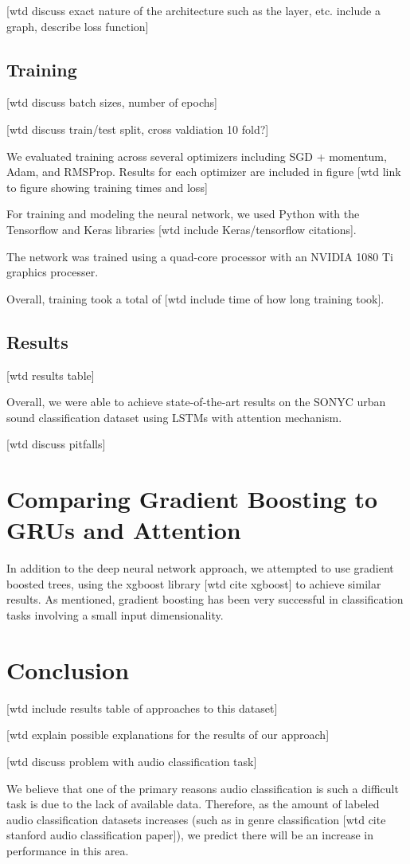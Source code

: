 [wtd discuss exact nature of the architecture such as the layer, etc. include a graph, describe loss function]

\section{Training}

[wtd discuss batch sizes, number of epochs]

[wtd discuss train/test split, cross valdiation 10 fold?]

We evaluated training across several optimizers including SGD + momentum, Adam, and RMSProp.  Results for each optimizer are included in figure [wtd link to figure showing training times and loss]

For training and modeling the neural network, we used Python with the Tensorflow and Keras libraries [wtd include Keras/tensorflow citations].

The network was trained using a quad-core processor with an NVIDIA 1080 Ti graphics processer.

Overall, training took a total of [wtd include time of how long training took].

\section{Results}

[wtd results table]

Overall, we were able to achieve state-of-the-art results on the SONYC urban sound classification dataset using LSTMs with attention mechanism.

[wtd discuss pitfalls]

\chapter{Comparing Gradient Boosting to GRUs and Attention}

In addition to the deep neural network approach, we attempted to use gradient boosted trees, using the xgboost library [wtd cite xgboost] to achieve similar results.  As mentioned, gradient boosting has been very successful in classification tasks involving a small input dimensionality.

\chapter{Conclusion}

[wtd include results table of approaches to this dataset]

[wtd explain possible explanations for the results of our approach]

[wtd discuss problem with audio classification task]

We believe that one of the primary reasons audio classification is such a difficult task is due to the lack of available data.  Therefore, as the amount of labeled audio classification datasets increases (such as in genre classification [wtd cite stanford audio classification paper]), we predict there will be an increase in performance in this area.

